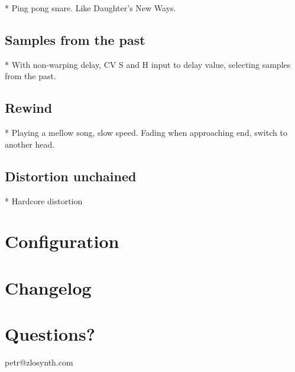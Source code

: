 \documentclass[11pt]{article}
\begin{document}
* Ping pong snare. Like Daughter's New Ways.

\subsection{Samples from the past}

* With non-warping delay, CV S and H input to delay value, selecting samples from
  the past.

\subsection{Rewind}

* Playing a mellow song, slow speed. Fading when approaching end, switch to another head.

\subsection{Distortion unchained}

* Hardcore distortion

\newpage





\noindent
\begin{minipage}[t]{0.3\textwidth}
\section{Configuration}
\end{minipage}%
\begin{minipage}{0.05\textwidth}
\phantom{ }
\end{minipage}%
\begin{minipage}[t]{0.3\textwidth}
\section{Changelog}
\end{minipage}
\begin{minipage}{0.05\textwidth}
\phantom{ }
\end{minipage}%
\begin{minipage}[t]{0.3\textwidth}
\section{Questions?}

\begin{center}
petr@zlosynth.com
\end{center}
\end{minipage}
\end{document}
